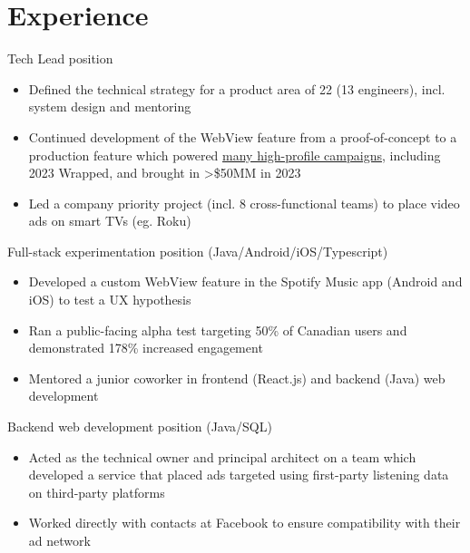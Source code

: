 
\makecvtitle

\section{Experience}
	{Tech Lead position}{
	\begin{itemize}
	\item Defined the technical strategy for a product area of 22 (13 engineers), incl. system design and mentoring
	\item Continued development of the WebView feature from a proof-of-concept to a production feature which powered \textcolor{color1}{\href{https://newsroom.spotify.com/2023-10-18/spotifys-interactive-experiences-create-the-magic-of-wrapped-year-round/}{many high-profile campaigns}}, including 2023 Wrapped, and brought in >\$50MM in 2023
	\item Led a company priority project (incl. 8 cross-functional teams) to place video ads on smart TVs (eg. Roku)
	\end{itemize}
	}
	{Full-stack experimentation position (Java/Android/iOS/Typescript)}{
	\begin{itemize}
	\item Developed a custom WebView feature in the Spotify Music app (Android and iOS) to test a UX hypothesis
	\item Ran a public-facing alpha test targeting 50\% of Canadian users and demonstrated 178\% increased engagement
	\item Mentored a junior coworker in frontend (React.js) and backend (Java) web development
	\end{itemize}
	}
	{Backend web development position (Java/SQL)}{
	\begin{itemize}
	\item Acted as the technical owner and principal architect on a team which developed a service that placed ads targeted using first-party listening data on third-party platforms
	\item Worked directly with contacts at Facebook to ensure compatibility with their ad network
	\end{itemize}
}

